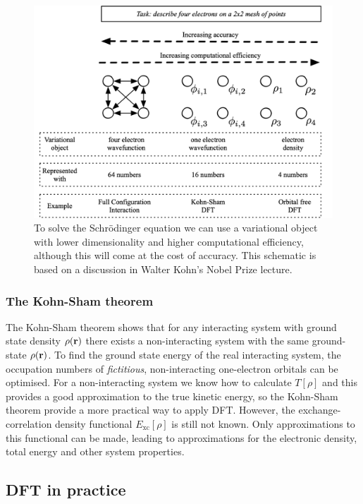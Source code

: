 \begin{figure}[h]
\centering
  \includegraphics[width=0.8\columnwidth]{figures/ch3/dimensions.png}
  \caption[Dimensionality of variational objects]{To solve the Schr\"{o}dinger equation we can use a variational object with lower dimensionality and higher computational efficiency, although this will come at the cost of accuracy. This schematic is based on a discussion in Walter Kohn's Nobel Prize lecture.\autocite{Kohn1999}}
  \label{dimensions}
\end{figure}


\subsubsection{The Kohn-Sham theorem} 

The Kohn-Sham theorem shows that for any interacting system with ground state density $\rho(\textbf{\textrm{r}})$ there exists a non-interacting system with the same ground-state $\rho(\textbf{\textrm{r}})$. To find the ground state energy of the real interacting system, the occupation numbers of \textit{fictitious}, non-interacting one-electron orbitals can be optimised. For a non-interacting system we know how to calculate $T\left[\rho\right]$ and this provides a good approximation to the true kinetic energy, so the Kohn-Sham theorem provide a more practical way to apply DFT. However, the exchange-correlation density functional $E_{\textrm{xc}}\left[\rho\right]$ is still not known. Only approximations to this functional can be made, leading to approximations for the electronic density, total energy and other system properties.


\subsection{DFT in practice}

